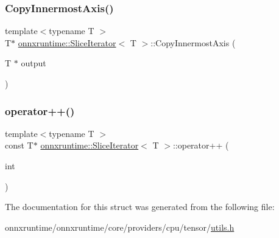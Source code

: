 \subsubsection{\texorpdfstring{Copy\+Innermost\+Axis()}{CopyInnermostAxis()}}
{\footnotesize\ttfamily template$<$typename T $>$ \\
T$\ast$ \mbox{\hyperlink{structonnxruntime_1_1SliceIterator}{onnxruntime\+::\+Slice\+Iterator}}$<$ T $>$\+::Copy\+Innermost\+Axis (\begin{DoxyParamCaption}\item[{T $\ast$}]{output }\end{DoxyParamCaption})\hspace{0.3cm}{\ttfamily [inline]}}

\mbox{\label{structonnxruntime_1_1SliceIterator_af66a075050c630b9cc9d3da9ba7987d2}} 
\subsubsection{\texorpdfstring{operator++()}{operator++()}}
{\footnotesize\ttfamily template$<$typename T $>$ \\
const T$\ast$ \mbox{\hyperlink{structonnxruntime_1_1SliceIterator}{onnxruntime\+::\+Slice\+Iterator}}$<$ T $>$\+::operator++ (\begin{DoxyParamCaption}\item[{int}]{ }\end{DoxyParamCaption})\hspace{0.3cm}{\ttfamily [inline]}}



The documentation for this struct was generated from the following file\+:\begin{DoxyCompactItemize}
\item 
onnxruntime/onnxruntime/core/providers/cpu/tensor/\mbox{\hyperlink{providers_2cpu_2tensor_2utils_8h}{utils.\+h}}\end{DoxyCompactItemize}
